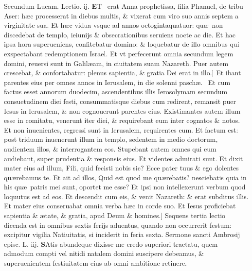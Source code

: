 \documentclass[a5paper,10pt]{book}
\def\ae{æ}
\begin{document}
\begin{multicols*}{2}
\newline \color{red} Secundum Lucam. \hfill Lectio. ij. \color{black}
\vspace{-.25em}
\lettrine[lines=2]{\bfseries \color{red} E}{}T \textdagger \ erat Anna prophetissa, filia Phanuel, de tribu Aser: h\ae c processerat in diebus multis, \& vixerat cum viro suo annis septem a virginitate sua.
Et h\ae c vidua vsque ad annos octogintaquatuor: qu\ae \ non discedebat de templo, ieiunijs \& obsecrationibus seruiens nocte ac die.
Et hac ipsa hora superueniens, confitebatur domino: \& loquebatur de illo omnibus qui exspectabant redemptionem Israel.
Et vt perfecerunt omnia secundum legem domini, reuersi sunt in Galil\ae am, in ciuitatem suam Nazareth.
Puer autem crescebat, \& confortabatur: plenus sapientia, \& gratia Dei erat in illo.]
Et ibant parentes eius per omnes annos in Ierusalem, in die solenni pasch\ae . \textdagger \ 
Et cum factus esset annorum duodecim, ascendentibus illis Ierosolymam secundum consuetudinem diei festi, consummatisque diebus cum redirent, remansit puer Iesus in Ierusalem, \& non cognouerunt parentes eius.
Existimantes autem illum esse in comitatu, venerunt iter diei, \& requirebant eum inter cognatos \& notos.
Et non inuenientes, regressi sunt in Ierusalem, requirentes eum. Et factum est: post triduum inuenerunt illum in templo, sedentem in medio doctorum, audientem illos, \& interrogantem eos.
Stupebant autem omnes qui eum audiebant, super prudentia \& responsis eius.
Et videntes admirati sunt. Et dixit mater eius ad illum, Fili, quid fecisti nobis sic?
Ecce pater tuus \& ego dolentes qu\ae rebamus te.
Et ait ad illos, Quid est quod me qu\ae rebatis? nesciebatis quia in his qu\ae \ patris mei sunt, oportet me esse?
Et ipsi non intellexerunt verbum quod loquutus est ad eos. Et descendit cum eis, \& venit Nazareth: \& erat subditus illis.
Et mater eius conseruabat omnia verba h\ae c in corde suo. Et Iesus proficiebat sapientia \& \ae tate, \& gratia, apud Deum \& homines.]
\newline \textswab{C} \color{red} Sequens tertia lectio dicenda est in omnibus sextis ferijs aduentus, quando non occurrerit festum: excipitur vigilia Natiuitatis, si inciderit in feria sexta. \color{black}
\newline \color{red} Sermone sancti Ambrosij episc. L. iij. \color{black}
\vspace{-.25em}
\lettrine[lines=2]{\bfseries \color{red} S}{}Atis abundeque dixisse me credo superiori tractatu, quem admodum compti vel nitidi natalem domini suscipere debeamus, \& superuenientem festiuitatem eius ab omni ambitione retinere.

\end{multicols*}
\end{document}
